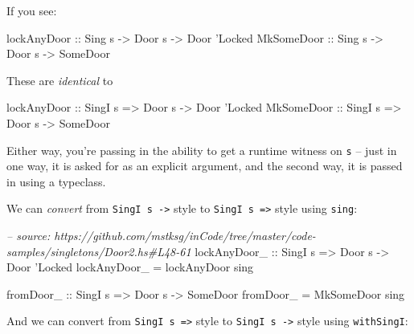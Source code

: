 \documentclass[]{article}
\newenvironment{Shaded}{}{}
\newcommand{\DataTypeTok}[1]{\textcolor[rgb]{0.56,0.13,0.00}{#1}}
\newcommand{\CharTok}[1]{\textcolor[rgb]{0.25,0.44,0.63}{#1}}
\newcommand{\CommentTok}[1]{\textcolor[rgb]{0.38,0.63,0.69}{\textit{#1}}}
\newcommand{\OtherTok}[1]{\textcolor[rgb]{0.00,0.44,0.13}{#1}}
\newcommand{\FunctionTok}[1]{\textcolor[rgb]{0.02,0.16,0.49}{#1}}
\newcommand{\NormalTok}[1]{#1}
\begin{document}
If you see:

\begin{Shaded}
\begin{Highlighting}[]
\OtherTok{lockAnyDoor ::} \DataTypeTok{Sing}\NormalTok{  s }\OtherTok{->} \DataTypeTok{Door}\NormalTok{ s }\OtherTok{->} \DataTypeTok{Door} \CharTok{'Locked}
\DataTypeTok{MkSomeDoor}\OtherTok{  ::} \DataTypeTok{Sing}\NormalTok{  s }\OtherTok{->} \DataTypeTok{Door}\NormalTok{ s }\OtherTok{->} \DataTypeTok{SomeDoor}
\end{Highlighting}
\end{Shaded}

These are \emph{identical} to

\begin{Shaded}
\begin{Highlighting}[]
\OtherTok{lockAnyDoor ::} \DataTypeTok{SingI}\NormalTok{ s }\OtherTok{=>} \DataTypeTok{Door}\NormalTok{ s }\OtherTok{->} \DataTypeTok{Door} \CharTok{'Locked}
\DataTypeTok{MkSomeDoor}\OtherTok{  ::} \DataTypeTok{SingI}\NormalTok{ s }\OtherTok{=>} \DataTypeTok{Door}\NormalTok{ s }\OtherTok{->} \DataTypeTok{SomeDoor}
\end{Highlighting}
\end{Shaded}

Either way, you're passing in the ability to get a runtime witness on \texttt{s}
-- just in one way, it is asked for as an explicit argument, and the second way,
it is passed in using a typeclass.

We can \emph{convert} from \texttt{SingI\ s\ -\textgreater{}} style to
\texttt{SingI\ s\ =\textgreater{}} style using \texttt{sing}:

\begin{Shaded}
\begin{Highlighting}[]
\CommentTok{-- source: https://github.com/mstksg/inCode/tree/master/code-samples/singletons/Door2.hs#L48-61}
\OtherTok{lockAnyDoor_ ::} \DataTypeTok{SingI}\NormalTok{ s }\OtherTok{=>} \DataTypeTok{Door}\NormalTok{ s }\OtherTok{->} \DataTypeTok{Door} \CharTok{'Locked}
\NormalTok{lockAnyDoor_ }\FunctionTok{=}\NormalTok{ lockAnyDoor sing}

\OtherTok{fromDoor_ ::} \DataTypeTok{SingI}\NormalTok{ s }\OtherTok{=>} \DataTypeTok{Door}\NormalTok{ s }\OtherTok{->} \DataTypeTok{SomeDoor}
\NormalTok{fromDoor_ }\FunctionTok{=} \DataTypeTok{MkSomeDoor}\NormalTok{ sing}
\end{Highlighting}
\end{Shaded}

And we can convert from \texttt{SingI\ s\ =\textgreater{}} style to
\texttt{SingI\ s\ -\textgreater{}} style using \texttt{withSingI}:
\end{document}
